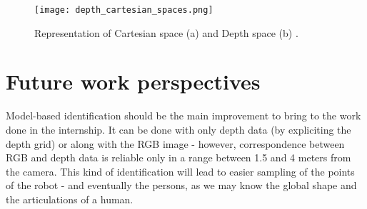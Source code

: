 \documentclass[smallextended]{svjour3}
\begin{document}
\begin{figure}
\centering
\texttt{[image: depth\_cartesian\_spaces.png]}
\caption{\label{fig:spaces}Representation of Cartesian space (a) and Depth space (b) \cite{Ref1}.}
\end{figure}

\section{\label{sect:futurework}Future work perspectives}

Model-based identification should be the main improvement to bring to the work done in the internship. It can be done with only depth data (by expliciting the depth grid) or along with the RGB image - however, correspondence between RGB and depth data is reliable only in a range between 1.5 and 4 meters from the camera. This kind of identification will lead to easier sampling of the points of the robot - and eventually the persons, as we may know the global shape and the articulations of a human.
\end{document}
